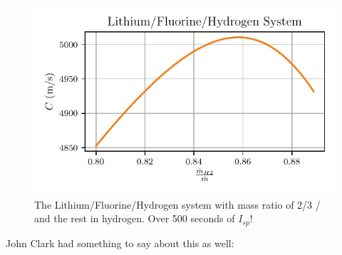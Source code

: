 \documentclass[twocolumn]{memoir} %
\begin{document}
\begin{figure}
    \includegraphics[width=\columnwidth]{li_f2_h2}
    \caption{The Lithium/Fluorine/Hydrogen system with mass ratio of 2/3  / 
    and the rest in hydrogen.  Over 500 seconds of $I_{sp}$!}
\end{figure}

John Clark had something to say about this as well:
\end{document}
